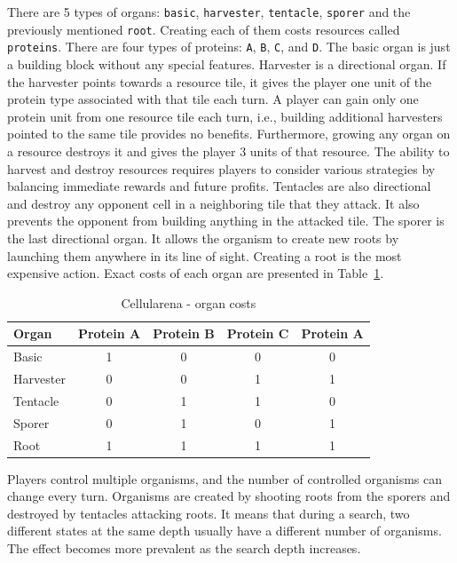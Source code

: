 \documentclass[shortabstract, mgr, english]{iithesis}
\begin{document}
There are 5 types of organs: \texttt{basic}, \texttt{harvester}, \texttt{tentacle}, \texttt{sporer} and the previously mentioned \texttt{root}. Creating each of them costs resources called \texttt{proteins}. There are four types of proteins: \texttt{A}, \texttt{B}, \texttt{C}, and \texttt{D}. The basic organ is just a building block without any special features. Harvester is a directional organ. If the harvester points towards a resource tile, it gives the player one unit of the protein type associated with that tile each turn. A player can gain only one protein unit from one resource tile each turn, i.e., building additional harvesters pointed to the same tile provides no benefits. Furthermore, growing any organ on a resource destroys it and gives the player 3 units of that resource. The ability to harvest and destroy resources requires players to consider various strategies by balancing immediate rewards and future profits. Tentacles are also directional and destroy any opponent cell in a neighboring tile that they attack. It also prevents the opponent from building anything in the attacked tile. The sporer is the last directional organ. It allows the organism to create new roots by launching them anywhere in its line of sight. Creating a root is the most expensive action. Exact costs of each organ are presented in Table~\ref{tab:CellularenaCosts}.
\begin{table}[H]
\centering
\begin{tabular}{lcccc}
\toprule
\textbf{Organ} & \textbf{Protein A} & \textbf{Protein B} & \textbf{Protein C} & \textbf{Protein A}  \\
\midrule
Basic     & 1 & 0 & 0 & 0\\
Harvester & 0 & 0 & 1 & 1\\
Tentacle  & 0 & 1 & 1 & 0\\
Sporer    & 0 & 1 & 0 & 1\\
Root      & 1 & 1 & 1 & 1\\
\bottomrule
\end{tabular}
\caption{Cellularena - organ costs}
\label{tab:CellularenaCosts}
\end{table}

Players control multiple organisms, and the number of controlled organisms can change every turn. Organisms are created by shooting roots from the sporers and destroyed by tentacles attacking roots.
It means that during a search, two different states at the same depth usually have a different number of organisms. The effect becomes more prevalent as the search depth increases.
\end{document}
